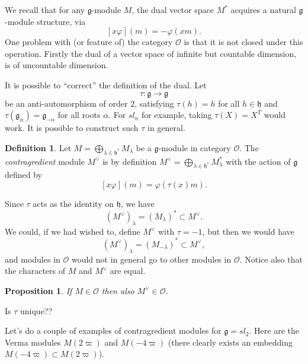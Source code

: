 \documentclass[12pt]{article}
\theoremstyle{plain}
\newtheorem{prop}[thm]{Proposition}
\theoremstyle{definition}
\newtheorem{defn}{Definition}[section]
\numberwithin{equation}{section}
\newcommand{\al}{\alpha}
\newcommand{\la}{\lambda}
\newcommand{\g}{\mathfrak{g}}
\newcommand{\h}{\mathfrak{h}}
\newcommand{\OO}{\mathcal{O}}
\begin{document}
%







We recall that for any $\g$-module $M$, the dual vector space $M^*$ acquires a natural $\g$-module structure, via
\[
[x \varphi](m) = -\varphi(x m).
\]
One problem with (or feature of) the category $\OO$ is that it is not closed under this operation. Firstly the dual of a vector space of infinite but countable dimension, is of uncountable dimension.


It is possible to ``correct'' the definition of the dual. Let
\[
\tau : \g \rightarrow \g
\]
be an anti-automorphism of order $2$, satisfying $\tau(h) = h$ for all $h \in \h$ and $\tau(\g_\al) = \g_{-\al}$ for all roots $\al$. For $sl_n$ for example, taking $\tau(X) = X^T$ would work. It is possible to construct such $\tau$ in general.
\begin{defn}
Let $M = \bigoplus_{\la \in \h^*} M_\la$ be a $\g$-module in category $\OO$. The \emph{contragredient} module $M^\vee$ is by definition $M^\vee = \bigoplus_{\la \in \h^*} M_\la^*$ with the action of $\g$ defined by
\[
[x \varphi](m) = \varphi(\tau(x) m).
\]
\end{defn}
Since $\tau$ acts as the identity on $\h$, we have
\[
(M^\vee)_\la = (M_\la)^* \subset M^\vee.
\]
We could, if we had wished to, define $M^\vee$ with $\tau = -1$, but then we would have
\[
(M^\vee)_\la = (M_{-\la})^* \subset M^\vee,
\]
and modules in $\OO$ would not in general go to other modules in $\OO$. Notice also that the characters of $M$ and $M^\vee$ are equal.

\begin{prop}
If $M \in \OO$ then also $M^\vee \in \OO$.
\end{prop}

{\color{red}Is $\tau$ unique??}

Let's do a couple of examples of contragredient modules for $\g = sl_2$. Here are the Verma modules $M(2\varpi)$ and $M(-4\varpi)$ (there clearly exists an embedding $M(-4\varpi) \subset M(2\varpi)$).
\end{document}
